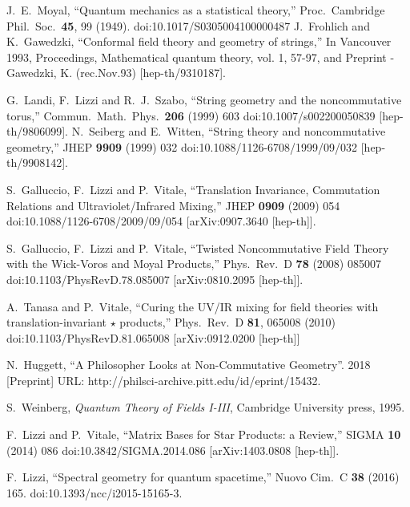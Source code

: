 \documentclass[12pt,a4paper]{article}
\begin{document}
\begin{thebibliography}{99}
 J.~E.~Moyal,
  ``Quantum mechanics as a statistical theory,''
  Proc.\ Cambridge Phil.\ Soc.\  {\bf 45}, 99 (1949).
  doi:10.1017/S0305004100000487
 J.~Frohlich and K.~Gawedzki,
  ``Conformal field theory and geometry of strings,''
  In Vancouver 1993, Proceedings, Mathematical quantum theory, vol. 1, 57-97, and Preprint - Gawedzki, K. (rec.Nov.93)   [hep-th/9310187].
  
 G.~Landi, F.~Lizzi and R.~J.~Szabo,
  ``String geometry and the noncommutative torus,''
  Commun.\ Math.\ Phys.\  {\bf 206} (1999) 603
  doi:10.1007/s002200050839
  [hep-th/9806099].
 N.~Seiberg and E.~Witten,
  ``String theory and noncommutative geometry,''
  JHEP {\bf 9909} (1999) 032
  doi:10.1088/1126-6708/1999/09/032
  [hep-th/9908142].


 S.~Galluccio, F.~Lizzi and P.~Vitale,
  ``Translation Invariance, Commutation Relations and Ultraviolet/Infrared Mixing,''
  JHEP {\bf 0909} (2009) 054
  doi:10.1088/1126-6708/2009/09/054
  [arXiv:0907.3640 [hep-th]].

  S.~Galluccio, F.~Lizzi and P.~Vitale,
  ``Twisted Noncommutative Field Theory with the Wick-Voros and Moyal Products,''
  Phys.\ Rev.\ D {\bf 78} (2008) 085007
  doi:10.1103/PhysRevD.78.085007
  [arXiv:0810.2095 [hep-th]].
  
A.~Tanasa and P.~Vitale,
  ``Curing the UV/IR mixing for field theories with translation-invariant $\star$ products,''
  Phys.\ Rev.\ D {\bf 81}, 065008 (2010)
  doi:10.1103/PhysRevD.81.065008
  [arXiv:0912.0200 [hep-th]]
  
 N.\ Huggett, ``A Philosopher Looks at Non-Commutative Geometry''.  2018  [Preprint]     URL: http://philsci-archive.pitt.edu/id/eprint/15432.

 S.\ Weinberg, \textit{Quantum Theory of Fields I-III}, Cambridge University press, 1995.

 F.~Lizzi and P.~Vitale,
  ``Matrix Bases for Star Products: a Review,''
  SIGMA {\bf 10} (2014) 086
  doi:10.3842/SIGMA.2014.086
  [arXiv:1403.0808 [hep-th]].
  
 F.~Lizzi,
  ``Spectral geometry for quantum spacetime,''
  Nuovo Cim.\ C {\bf 38} (2016) 165.
  doi:10.1393/ncc/i2015-15165-3.
  

\end{thebibliography}
\end{document}
